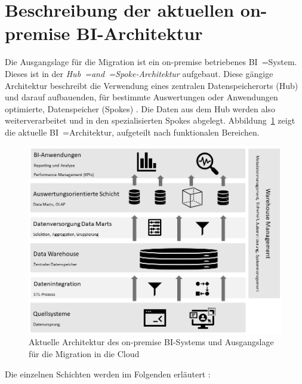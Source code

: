 \section{Beschreibung der aktuellen on-premise BI-Architektur} \label{sec:grundlagen:onpremiseBI}
Die Ausgangslage für die Migration ist ein on-premise betriebenes BI~=System. Dieses ist in der \textit{Hub~=and~=Spoke-Architektur} aufgebaut. Diese gängige Architektur beschreibt die Verwendung eines zentralen Datenspeicherorts (Hub) und darauf aufbauenden, für bestimmte Auswertungen oder Anwendungen optimierte, Datenspeicher (Spokes) \cite{kemper_bi-glossar_2008}. Die Daten aus dem Hub werden also weiterverarbeitet und in den spezialisierten Spokes abgelegt. Abbildung~\ref{fig:aktuelle_onpremise_bi_architektur} zeigt die aktuelle BI~=Architektur, aufgeteilt nach funktionalen Bereichen.
\begin{figure}[htbp]
 \centering
 \includegraphics[width=\textwidth]{gfx/aktuelle_onpremise_bi_architektur.png}
 \caption{Aktuelle Architektur des on-premise BI-Systems und Ausgangslage für die Migration in die Cloud \cite{grunwald_business_2009}\cite{humm_architektur_2005}}
\label{fig:aktuelle_onpremise_bi_architektur}
\end{figure}
Die einzelnen Schichten werden im Folgenden erläutert \cite{grunwald_business_2009}\cite{kemper_bi-glossar_2008}\cite{humm_architektur_2005}:
